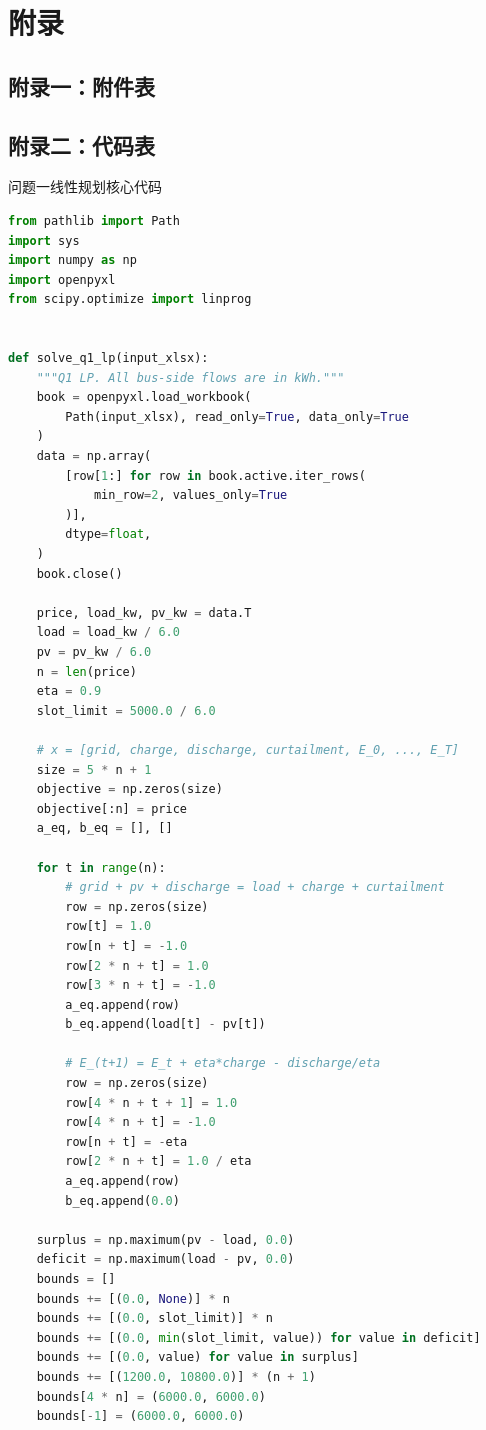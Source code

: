 \documentclass[UTF8,a4paper,12pt]{ctexart}
\begin{document}

\section*{附录}

\subsection*{附录一：附件表}



\subsection*{附录二：代码表}
问题一线性规划核心代码
\begin{lstlisting}[language=Python]
from pathlib import Path
import sys
import numpy as np
import openpyxl
from scipy.optimize import linprog


def solve_q1_lp(input_xlsx):
    """Q1 LP. All bus-side flows are in kWh."""
    book = openpyxl.load_workbook(
        Path(input_xlsx), read_only=True, data_only=True
    )
    data = np.array(
        [row[1:] for row in book.active.iter_rows(
            min_row=2, values_only=True
        )],
        dtype=float,
    )
    book.close()

    price, load_kw, pv_kw = data.T
    load = load_kw / 6.0
    pv = pv_kw / 6.0
    n = len(price)
    eta = 0.9
    slot_limit = 5000.0 / 6.0

    # x = [grid, charge, discharge, curtailment, E_0, ..., E_T]
    size = 5 * n + 1
    objective = np.zeros(size)
    objective[:n] = price
    a_eq, b_eq = [], []

    for t in range(n):
        # grid + pv + discharge = load + charge + curtailment
        row = np.zeros(size)
        row[t] = 1.0
        row[n + t] = -1.0
        row[2 * n + t] = 1.0
        row[3 * n + t] = -1.0
        a_eq.append(row)
        b_eq.append(load[t] - pv[t])

        # E_(t+1) = E_t + eta*charge - discharge/eta
        row = np.zeros(size)
        row[4 * n + t + 1] = 1.0
        row[4 * n + t] = -1.0
        row[n + t] = -eta
        row[2 * n + t] = 1.0 / eta
        a_eq.append(row)
        b_eq.append(0.0)

    surplus = np.maximum(pv - load, 0.0)
    deficit = np.maximum(load - pv, 0.0)
    bounds = []
    bounds += [(0.0, None)] * n
    bounds += [(0.0, slot_limit)] * n
    bounds += [(0.0, min(slot_limit, value)) for value in deficit]
    bounds += [(0.0, value) for value in surplus]
    bounds += [(1200.0, 10800.0)] * (n + 1)
    bounds[4 * n] = (6000.0, 6000.0)
    bounds[-1] = (6000.0, 6000.0)


\end{lstlisting}
\end{document}
